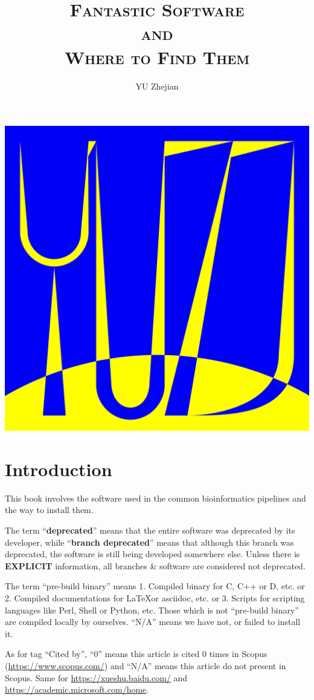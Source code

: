 \documentclass[]{article}
\begin{document}
\title{\fontsize{40}{40}\selectfont\scshape Fantastic Software\\{\Huge and}\\Where to Find Them}
\author{YU Zhejian}
\maketitle
\setcounter{section}{-1}
\begin{center}
\includegraphics[width=0.5\linewidth]{YuZJLab_BG.png}
\end{center}
\section{Introduction}

This book involves the software used in the common bioinformatics pipelines and the way to install them.

The term ``\textbf{deprecated}'' means that the entire software was deprecated by its developer, while ``\textbf{branch deprecated}'' means that although this branch was deprecated, the software is still being developed somewhere else. Unless there is \textbf{EXPLICIT} information, all branches \& software are considered not deprecated.

The term ``pre-build binary'' means 1. Compiled binary for C, C++ or D, etc. or 2. Compiled documentations for \LaTeX or asciidoc, etc. or 3. Scripts for scripting languages like Perl, Shell or Python, etc. Those which is not ``pre-build binary'' are compiled locally by ourselves. ``N/A'' means we have not, or failed to install it.

As for tag ``Cited by'', ``0'' means this article is cited 0 times in Scopus (\url{https://www.scopus.com/}) and ``N/A'' means this article do not present in Scopus. Same for \url{https://xueshu.baidu.com/} and \url{https://academic.microsoft.com/home}.
\end{document}
